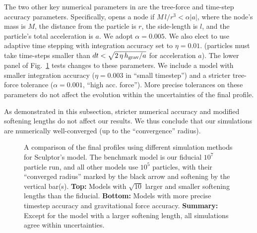 The two other key numerical parameters in \gadget{} are the tree-force
and time-step accuracy parameters. Specifically, \gadget{} opens a node
if \(M\,l/r^3 < \alpha |a|\), where the node's mass is \(M\), the
distance from the particle is \(r\), the side-length is \(l\), and the
particle's total acceleration is \(a\). We adopt \(\alpha =0.005\). We
also elect to use adaptive time stepping with integration accuracy set
to \(\eta=0.01\). (particles must take time-steps smaller than
\(dt < \sqrt{2\,\eta\,h_{\rm grav} / a}\) for acceleration \(a\)). The
lower panel of Fig.~\ref{fig:methods_convergence} tests changes to these
parameters. We include a model with smaller integration accuracy
(\(\eta=0.003\) in ``small timestep'') and a stricter tree-force
tolerance (\(\alpha=0.001\), ``high acc. force''). More precise
tolerances on these parameters do not affect the evolution within the
uncertainties of the final profile.

As demonstrated in this subsection, stricter numerical accuracy and
modified softening lengths do not affect our results. We thus conclude
that our simulations are numerically well-converged (up to the
``convergence'' radius).

\begin{figure}
\centering
{}
\caption[Isolation method convergence]{A comparison of the final
profiles using different simulation methods for Sculptor's \smallperi{}
model. The benchmark model is our fiducial \(10^7\) particle run, and
all other models use \(10^5\) particles, with their ``converged radius''
marked by the black arrow and softening by the vertical bar(s).
\textbf{Top:} Models with \(\sqrt{10}\) larger and smaller softening
lengths than the fiducial. \textbf{Bottom:} Models with more precise
timestep accuracy and gravitational force accuracy. \textbf{Summary:}
Except for the model with a larger softening length, all simulations
agree within uncertainties.}\label{fig:methods_convergence}
\end{figure}
